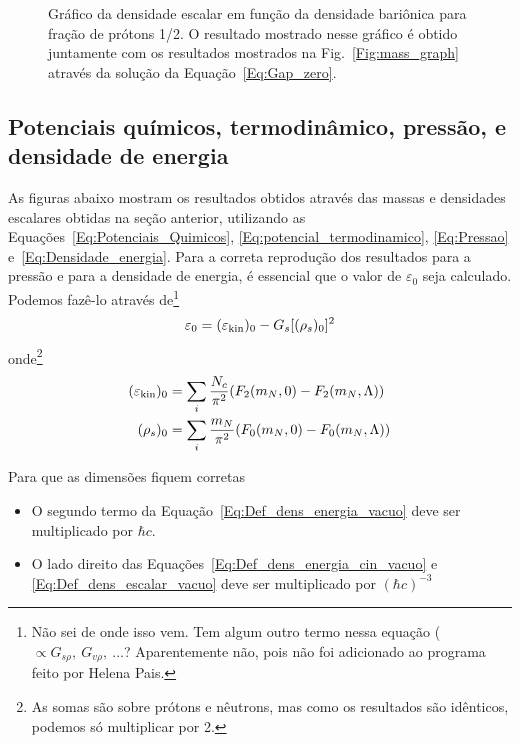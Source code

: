 \begin{enumerate}
\begin{figure}
	
	\caption{Gráfico da densidade escalar em função da densidade bariônica para fração de prótons 1/2. O resultado mostrado nesse gráfico é obtido juntamente com os resultados mostrados na Fig.~\ref{Fig:mass_graph} através da solução da Equação~\ref{Eq:Gap_zero}. \protect}
	\label{Fig:scalar_density_graph}
\end{figure}

\FloatBarrier
\subsection{Potenciais químicos, termodinâmico, pressão, e densidade de energia}

As figuras abaixo mostram os resultados obtidos através das massas e densidades escalares obtidas na seção anterior, utilizando as Equações~\eqref{Eq:Potenciais_Quimicos}, \eqref{Eq:potencial_termodinamico}, \eqref{Eq:Pressao} e~\eqref{Eq:Densidade_energia}. Para a correta reprodução dos resultados para a pressão e para a densidade de energia, é essencial que o valor de $\varepsilon_0$ seja calculado. Podemos fazê-lo através de\footnote{Não sei de onde isso vem. Tem algum outro termo nessa equação ($\propto G_{s\rho},~G_{v\rho},~\dots$? Aparentemente não, pois não foi adicionado ao programa feito por Helena Pais.}
\begin{equation}\label{Eq:Def_dens_energia_vacuo}
	\varepsilon_0 = (\varepsilon_{\rm{kin}})_0 - G_s [(\rho_s)_0]^2
\end{equation}
%
onde\footnote{As somas são sobre prótons e nêutrons, mas como os resultados são idênticos, podemos só multiplicar por 2.}
\begin{align}
	(\varepsilon_{\rm{kin}})_0 &= \sum_i \frac{N_c}{\pi^2} (F_2(m_N,0) - F_2(m_N, \Lambda)) \label{Eq:Def_dens_energia_cin_vacuo}\\
	(\rho_s)_0 &= \sum_i \frac{m_N}{\pi^2} (F_0(m_N, 0) - F_0(m_N, \Lambda)) \label{Eq:Def_dens_escalar_vacuo}
\end{align}

Para que as dimensões fiquem corretas
\begin{itemize}
	\item O segundo termo da Equação~\eqref{Eq:Def_dens_energia_vacuo} deve ser multiplicado por $\hbar c$.
	\item O lado direito das Equações~\eqref{Eq:Def_dens_energia_cin_vacuo} e \eqref{Eq:Def_dens_escalar_vacuo} deve ser multiplicado por $(\hbar c)^{-3}$
\end{itemize}


\end{enumerate}
